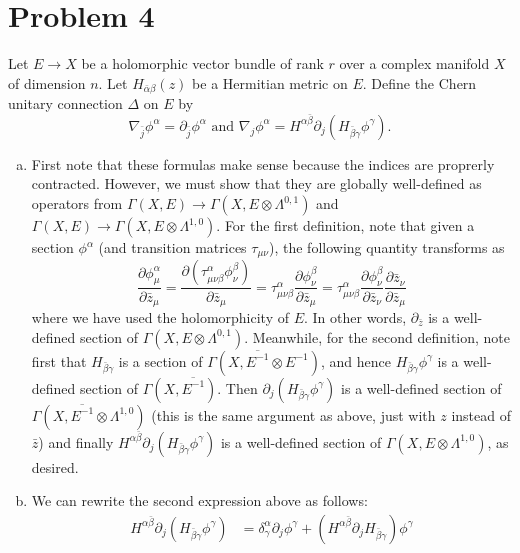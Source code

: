 \documentclass{../mathnotes}
\begin{document}
\section*{Problem 4}
Let $E\to X$ be a holomorphic vector bundle of rank $r$ over a complex manifold $X$ of dimension $n$. Let $H_{\bar\alpha\beta}(z)$ be a Hermitian metric on $E$.
Define the Chern unitary connection $\Delta$ on $E$ by
\[\nabla_{\bar j}\phi^{\alpha}=\partial_{\bar j}\phi^\alpha \text{ and } \nabla_j\phi^\alpha=H^{\alpha\bar\beta}\partial_j(H_{\bar\beta\gamma}\phi^{\gamma}).\]
\begin{enumerate}[(a)]
    \item First note that these formulas make sense because the indices are proprerly contracted. However, we must show that they are globally well-defined as operators
        from $\Gamma(X,E)\to\Gamma(X,E\otimes\Lambda^{0,1})$ and $\Gamma(X,E)\to\Gamma(X,E\otimes\Lambda^{1,0})$. For the first definition, note that given a section
        $\phi^{\alpha}$ (and transition matrices $\tau_{\mu\nu}$), the following quantity transforms as
        \[\frac{\partial\phi_\mu^\alpha}{\partial \bar z_\mu}=\frac{\partial(\tau_{\mu\nu\beta}^\alpha\phi_\nu^\beta)}{\partial\bar z_\mu} =\tau_{\mu\nu\beta}^\alpha\frac{\partial\phi_\nu^\beta}{\partial \bar z_\mu}=\tau_{\mu\nu\beta}^\alpha\frac{\partial\phi_\nu^\beta}{\partial\bar z_\nu}\frac{\partial\bar z_\nu}{\partial\bar z_\mu}\]
        where we have used the holomorphicity of $E$. In other words, $\partial_{\bar z}$ is a well-defined section of $\Gamma(X,E\otimes\Lambda^{0,1})$. Meanwhile, for
        the second definition, note first that $H_{\bar\beta\gamma}$ is a section of $\Gamma(X,\overline{E^{-1}}\otimes E^{-1})$, and hence $H_{\bar\beta\gamma}\phi^\gamma$
        is a well-defined section of $\Gamma(X,\overline{E^{-1}})$. Then $\partial_j(H_{\bar\beta\gamma}\phi^\gamma)$ is a well-defined section of $\Gamma(X,\overline{E^{-1}}\otimes \Lambda^{1,0})$
        (this is the same argument as above, just with $z$ instead of $\bar z$) and finally $H^{\alpha\bar\beta}\partial_j(H_{\bar\beta\gamma}\phi^{\gamma})$ is a well-defined
        section of $\Gamma(X,E\otimes \Lambda^{1,0})$, as desired.
    \item We can rewrite the second expression above as follows:
        \begin{align*}
            H^{\alpha\bar\beta}\partial_j(H_{\bar\beta\gamma}\phi^{\gamma})&=\delta^{\alpha}_\gamma\partial_j\phi^\gamma+(H^{\alpha\bar\beta}\partial_jH_{\bar\beta\gamma})\phi^\gamma\\

\end{align*}
\end{enumerate}
\end{document}
